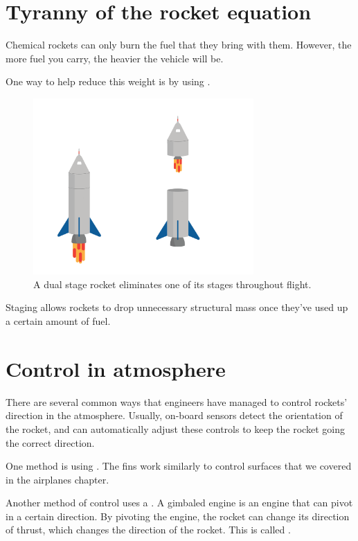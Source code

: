\section{Tyranny of the rocket equation}
	Chemical rockets can only burn the fuel that they bring with them. However, the more fuel you carry, the heavier the vehicle will be.

 

	One way to help reduce this weight is by using . 
	\begin{figure}[htbp]
    \centering
	\includegraphics[width=0.75\textwidth]{stagingDual.png}
    \caption{A dual stage rocket eliminates one of its stages throughout flight.}
    \label{fig:dualStaged}
\end{figure}
	Staging allows rockets to drop unnecessary structural mass once they've used up a certain amount of fuel. 



\section{Control in atmosphere} 
There are several common ways that engineers have managed to control rockets' direction in the atmosphere. Usually, on-board sensors detect the orientation of the rocket, and can automatically adjust these controls to keep the rocket going the correct direction.

	
	One method is using . The fins work similarly to control surfaces that we covered in the airplanes chapter. 

	Another method of control uses a . A gimbaled engine is an engine that can pivot in a certain direction. 
	By pivoting the engine, the rocket can change its direction of thrust, which changes the direction of the rocket. This is called . 

